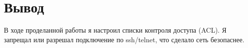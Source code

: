 \chapter{Вывод}
В ходе проделанной работы я настроил списки контроля доступа (ACL). Я запрещал или разрешал подключение по ssh/telnet, что сделало сеть безопаснее.